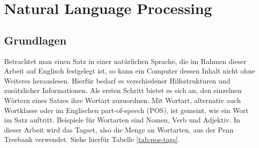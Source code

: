 %
\chapter{Natural Language Processing}
\label{sec:nlp}

\section{Grundlagen}
\label{sec:nlp:grundlagen}

Betrachtet man einen Satz in einer natürlichen Sprache, die im Rahmen dieser Arbeit auf Englisch festgelegt ist, so kann ein Computer dessen Inhalt nicht ohne Weiteres herauslesen. Hierfür bedarf es verschiedener Hilfsstrukturen und zusätzlicher Informationen. Als ersten Schritt bietet es sich an, den einzelnen Wörtern eines Satzes ihre Wortart zuzuordnen. Mit Wortart, alternativ auch Wortklasse oder im Englischen part-of-speech (POS), ist gemeint, wie ein Wort im Satz auftritt. Beispiele für Wortarten sind Nomen, Verb und Adjektiv. In dieser Arbeit wird das Tagset, also die Menge an Wortarten, aus der Penn Treebank verwendet. Siehe hierfür Tabelle \ref{tab:pos-tags}.
